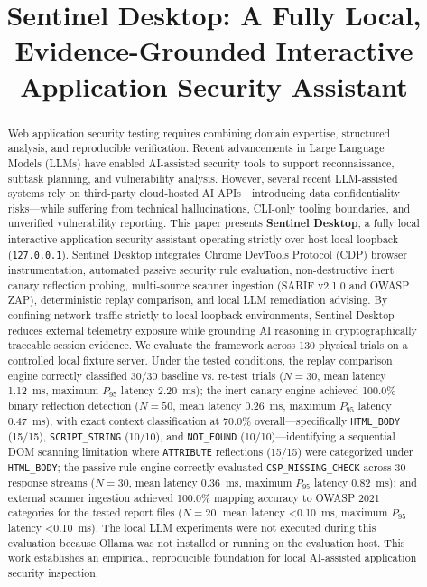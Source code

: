 \documentclass[conference]{IEEEtran}
\begin{document}
\title{Sentinel Desktop: A Fully Local, Evidence-Grounded Interactive Application Security Assistant}

\author{
}

\maketitle

\begin{abstract}
Web application security testing requires combining domain expertise, structured analysis, and reproducible verification. Recent advancements in Large Language Models (LLMs) have enabled AI-assisted security tools to support reconnaissance, subtask planning, and vulnerability analysis. However, several recent LLM-assisted systems rely on third-party cloud-hosted AI APIs—introducing data confidentiality risks—while suffering from technical hallucinations, CLI-only tooling boundaries, and unverified vulnerability reporting. This paper presents \textbf{Sentinel Desktop}, a fully local interactive application security assistant operating strictly over host local loopback (\texttt{127.0.0.1}). Sentinel Desktop integrates Chrome DevTools Protocol (CDP) browser instrumentation, automated passive security rule evaluation, non-destructive inert canary reflection probing, multi-source scanner ingestion (SARIF v2.1.0 and OWASP ZAP), deterministic replay comparison, and local LLM remediation advising. By confining network traffic strictly to local loopback environments, Sentinel Desktop reduces external telemetry exposure while grounding AI reasoning in cryptographically traceable session evidence. We evaluate the framework across 130 physical trials on a controlled local fixture server. Under the tested conditions, the replay comparison engine correctly classified 30/30 baseline vs. re-test trials ($N=30$, mean latency 1.12~ms, maximum $P_{95}$ latency 2.20~ms); the inert canary engine achieved 100.0\% binary reflection detection ($N=50$, mean latency 0.26~ms, maximum $P_{95}$ latency 0.47~ms), with exact context classification at 70.0\% overall—specifically \texttt{HTML\_BODY} (15/15), \texttt{SCRIPT\_STRING} (10/10), and \texttt{NOT\_FOUND} (10/10)—identifying a sequential DOM scanning limitation where \texttt{ATTRIBUTE} reflections (15/15) were categorized under \texttt{HTML\_BODY}; the passive rule engine correctly evaluated \texttt{CSP\_MISSING\_CHECK} across 30 response streams ($N=30$, mean latency 0.36~ms, maximum $P_{95}$ latency 0.82~ms); and external scanner ingestion achieved 100.0\% mapping accuracy to OWASP 2021 categories for the tested report files ($N=20$, mean latency <0.10~ms, maximum $P_{95}$ latency <0.10~ms). The local LLM experiments were not executed during this evaluation because Ollama was not installed or running on the evaluation host. This work establishes an empirical, reproducible foundation for local AI-assisted application security inspection.
\end{abstract}
\end{document}
